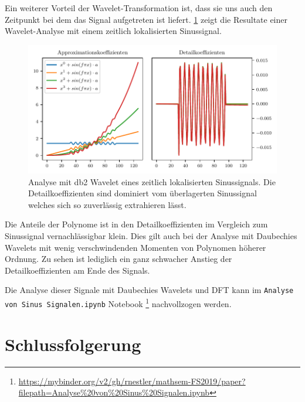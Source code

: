 \begin{refsection}
Ein weiterer Vorteil der Wavelet-Transformation ist, dass sie uns auch den
Zeitpunkt bei dem das Signal aufgetreten ist liefert.
\cref{polynomials:sin:padded} zeigt die Resultate einer Wavelet-Analyse mit
einem zeitlich lokalisierten Sinussignal.
\begin{figure}
    \centering
    \includegraphics{papers/polynomials/images/polynomials_sin_padded_db2.pdf}
    \caption{Analyse mit db2 Wavelet eines zeitlich lokalisierten
             Sinussignals. Die Detailkoeffizienten sind dominiert vom
             überlagerten Sinussignal welches sich so zuverlässig extrahieren
             lässt.\label{polynomials:sin:padded}}
\end{figure}
Die Anteile der Polynome ist in den Detailkoeffizienten im Vergleich zum
Sinussignal vernachlässigbar klein. Dies gilt auch bei der Analyse mit
Daubechies Wavelets mit wenig verschwindenden Momenten von Polynomen höherer
Ordnung. Zu sehen ist lediglich ein ganz schwacher Anstieg der
Detailkoeffizienten am Ende des Signals.

Die Analyse dieser Signale mit Daubechies Wavelets und DFT kann im
\texttt{Analyse von Sinus Signalen.ipynb} Notebook%
\footnote{\url{https://mybinder.org/v2/gh/rnestler/mathsem-FS2019/paper?filepath=Analyse\%20von\%20Sinus\%20Signalen.ipynb}}
nachvollzogen werden.

\section{Schlussfolgerung}

\printbibliography[heading=subbibliography]
\end{refsection}
